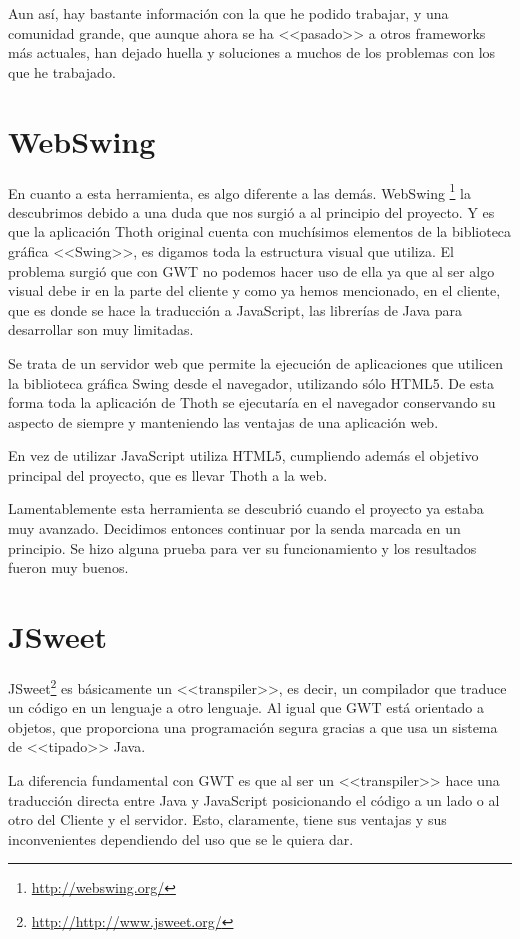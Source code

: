 Aun así, hay bastante información con la que he podido trabajar, y una comunidad grande, que aunque ahora se ha <<pasado>> a otros frameworks más actuales, han dejado huella y soluciones a muchos de los problemas con los que he trabajado.

\section{WebSwing}

En cuanto a esta herramienta, es algo diferente a las demás. WebSwing \footnote{\url{http://webswing.org/}} la descubrimos debido a una duda que nos surgió a al principio del proyecto. Y es que la aplicación Thoth original cuenta con muchísimos elementos de la biblioteca gráfica <<Swing>>, es digamos toda la estructura visual que utiliza. El problema surgió que con GWT no podemos hacer uso de ella ya que al ser algo visual debe ir en la parte del cliente y como ya hemos mencionado, en el cliente, que es donde se hace la traducción a JavaScript, las librerías de Java para desarrollar son muy limitadas. 

Se trata de un servidor web que permite la ejecución de aplicaciones que utilicen la biblioteca gráfica Swing desde el navegador, utilizando sólo HTML5. De esta forma toda la aplicación de Thoth se ejecutaría en el navegador conservando su aspecto de siempre y manteniendo las ventajas de una aplicación web.

En vez de utilizar JavaScript utiliza HTML5, cumpliendo además el objetivo principal del proyecto, que es llevar Thoth a la web.

Lamentablemente esta herramienta se descubrió cuando el proyecto ya estaba muy avanzado. Decidimos entonces continuar por la senda marcada en un principio. Se hizo alguna prueba para ver su funcionamiento y los resultados fueron muy buenos.

\section{JSweet} 

JSweet\footnote{\url{http://http://www.jsweet.org/}} es básicamente un <<transpiler>>, es decir, un compilador que traduce un código en un lenguaje a otro lenguaje. Al igual que GWT está orientado a objetos, que proporciona una programación segura gracias a que usa un sistema de <<tipado>> Java.

La diferencia fundamental con GWT es que al ser un <<transpiler>> hace una traducción directa entre Java y JavaScript posicionando el código a un lado o al otro del Cliente y el servidor. Esto, claramente, tiene sus ventajas y sus inconvenientes dependiendo del uso que se le quiera dar. 

